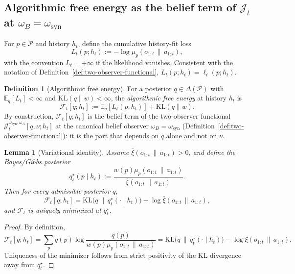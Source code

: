 \documentclass[11pt]{article}
\newtheorem{lemma}[theorem]{Lemma}
\theoremstyle{definition}
\newtheorem{definition}[theorem]{Definition}
\theoremstyle{remark}
\newcommand{\Pcal}{\mathcal{P}}
\newcommand{\Fcal}{\mathcal{F}}
\newcommand{\E}{\mathbb{E}}
\newcommand{\KL}{\mathrm{KL}}
\newcommand{\givena}{\,\|\,}
\newcommand{\ellp}{\ell}
\newcommand{\barxi}{\bar{\xi}}
\begin{document}
\subsection{Algorithmic free energy as the belief term of $\mathcal J_t$ at $\omega_B=\omega_{\mathrm{syn}}$}

For $p\in\Pcal$ and history $h_t$, define the cumulative history-fit loss
\[
L_t(p;h_t):=-\log\mu_p(o_{1:t}\givena a_{1:t}),
\]
with the convention $L_t=+\infty$ if the likelihood vanishes. Consistent with the notation of Definition~\ref{def:two-observer-functional}, $L_t(p;h_t)=\ellp_t(p;h_t)$.

\begin{definition}[Algorithmic free energy]
\label{def:afe}
For a posterior $q\in\Delta(\Pcal)$ with $\E_q[L_t]<\infty$ and $\KL(q\|w)<\infty$, the \emph{algorithmic free energy} at history $h_t$ is
\[
\Fcal_t[q;h_t]:=\E_q[L_t(p;h_t)]+\KL(q\|w).
\]
By construction, $\Fcal_t[q;h_t]$ is the belief term of the two-observer functional $\mathcal J_t^{\omega_{\mathrm{syn}},\omega_A}[q,\nu;h_t]$ at the canonical belief observer $\omega_B=\omega_{\mathrm{syn}}$ (Definition~\ref{def:two-observer-functional}): it is the part that depends on $q$ alone and not on $\nu$.
\end{definition}

\begin{lemma}[Variational identity]
\label{lem:variational}
Assume $\barxi(o_{1:t}\givena a_{1:t})>0$, and define the Bayes/Gibbs posterior
\[
q_t^\star(p\mid h_t):=\frac{w(p)\mu_p(o_{1:t}\givena a_{1:t})}{\barxi(o_{1:t}\givena a_{1:t})}.
\]
Then for every admissible posterior $q$,
\[
\Fcal_t[q;h_t]
=
\KL\!\bigl(q\,\|\,q_t^\star(\cdot\mid h_t)\bigr)-\log\barxi(o_{1:t}\givena a_{1:t}),
\]
and $\Fcal_t$ is uniquely minimized at $q_t^\star$.
\end{lemma}

\begin{proof}
By definition,
\[
\Fcal_t[q;h_t]=\sum_p q(p)\log\frac{q(p)}{w(p)\mu_p(o_{1:t}\givena a_{1:t})}
=\KL\!\bigl(q\,\|\,q_t^\star(\cdot\mid h_t)\bigr)-\log\barxi(o_{1:t}\givena a_{1:t}).
\]
Uniqueness of the minimizer follows from strict positivity of the KL divergence away from $q_t^\star$.
\end{proof}
\end{document}
